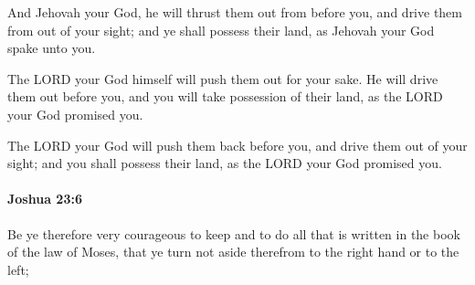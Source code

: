 			\begin{versebox}
					\item[BHS] 
					\item[ASV] And Jehovah your God, he will thrust them out from before you, and drive them from out of your sight; and ye shall possess their land, as Jehovah your God spake unto you.
					\item[NIV] The LORD your God himself will push them out for your sake. He will drive them out before you, and you will take possession of their land, as the LORD your God promised you.
					\item[NRSV] The LORD your God will push them back before you, and drive them out of your sight; and you shall possess their land, as the LORD your God promised you.
			\end{versebox}

		\paragraph{Joshua 23:6} %
			\label{JOSHUA-23-6}

			Be ye therefore very courageous to keep and to do all that is written in the book of the law of Moses, that ye turn not aside therefrom to the right hand or to the left;

